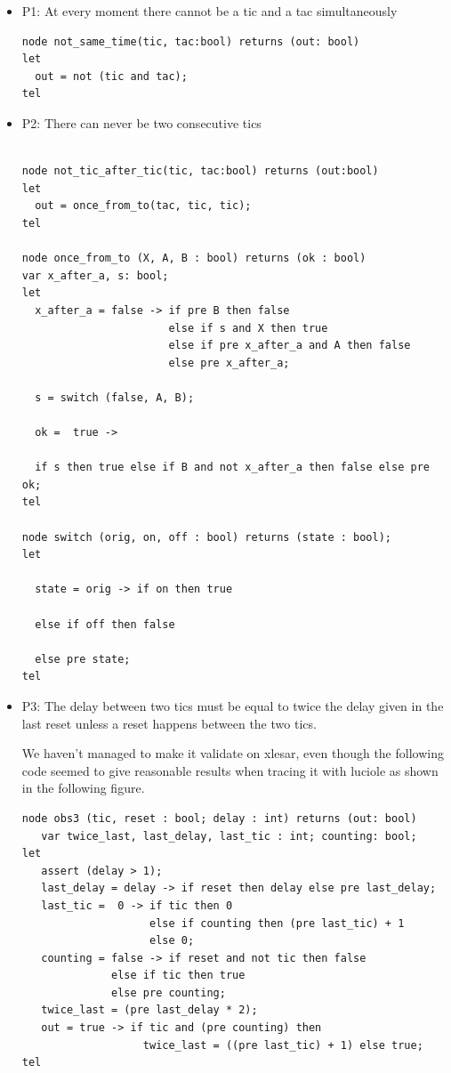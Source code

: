 \documentclass{article}
\begin{document}
\begin{itemize}

\item P1: At every moment there cannot be a tic and a tac simultaneously

\begin{verbatim}
node not_same_time(tic, tac:bool) returns (out: bool)
let
  out = not (tic and tac);
tel
\end{verbatim}

\item P2: There can never be two consecutive tics 

\begin{verbatim}

node not_tic_after_tic(tic, tac:bool) returns (out:bool)
let
  out = once_from_to(tac, tic, tic);
tel

node once_from_to (X, A, B : bool) returns (ok : bool)
var x_after_a, s: bool;
let
  x_after_a = false -> if pre B then false
                       else if s and X then true
                       else if pre x_after_a and A then false
                       else pre x_after_a;

  s = switch (false, A, B);

  ok =  true ->

  if s then true else if B and not x_after_a then false else pre ok;
tel

node switch (orig, on, off : bool) returns (state : bool);
let

  state = orig -> if on then true

  else if off then false

  else pre state;
tel

\end{verbatim}

\item P3: The delay between two tics must be equal to twice the delay
  given in the last reset unless a reset happens between the two tics.

We haven't managed to make it validate on xlesar, even though the
following code seemed to give reasonable results when tracing it with
luciole as shown in the following figure.


\begin{verbatim}
node obs3 (tic, reset : bool; delay : int) returns (out: bool)
   var twice_last, last_delay, last_tic : int; counting: bool;
let
   assert (delay > 1);
   last_delay = delay -> if reset then delay else pre last_delay;
   last_tic =  0 -> if tic then 0
                    else if counting then (pre last_tic) + 1
                    else 0;
   counting = false -> if reset and not tic then false
              else if tic then true
              else pre counting;
   twice_last = (pre last_delay * 2);
   out = true -> if tic and (pre counting) then 
                   twice_last = ((pre last_tic) + 1) else true;
tel
\end{verbatim}


\end{itemize}
\end{document}
